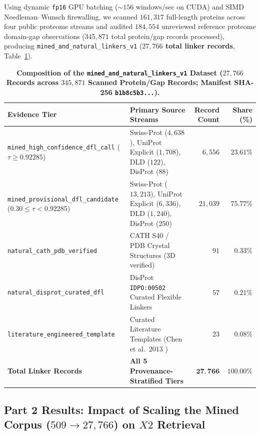 \documentclass[11pt]{article}
\begin{document}
Using dynamic \texttt{fp16} GPU batching ($\sim 156$ windows/sec on CUDA) and SIMD Needleman--Wunsch firewalling, we scanned $161{,}317$ full-length proteins across four public proteome streams and audited $184{,}554$ unreviewed reference proteome domain-gap observations ($345{,}871$ total protein/gap records processed), producing \texttt{mined\_and\_natural\_linkers\_v1} (\textbf{$27{,}766$ total linker records}, Table~\ref{tab:dataset_v1}).

\begin{table}[h]
\centering
\caption{\textbf{Composition of the \texttt{mined\_and\_natural\_linkers\_v1} Dataset ($27{,}766$ Records across $345{,}871$ Scanned Protein/Gap Records; Manifest SHA-256 \texttt{b1b8c5b3...}).}}
\label{tab:dataset_v1}
\small
\begin{tabular}{l l r r}
\toprule
\textbf{Evidence Tier} & \textbf{Primary Source Streams} & \textbf{Record Count} & \textbf{Share (\%)} \\
\midrule
\texttt{mined\_high\_confidence\_dfl\_call} ($\tau \ge 0.92285$) & Swiss-Prot ($4{,}638$), UniProt Explicit ($1{,}708$), DLD ($122$), DisProt ($88$) & $6{,}556$ & $23.61\%$ \\
\texttt{mined\_provisional\_dfl\_candidate} ($0.30 \le \tau < 0.92285$) & Swiss-Prot ($13{,}213$), UniProt Explicit ($6{,}336$), DLD ($1{,}240$), DisProt ($250$) & $21{,}039$ & $75.77\%$ \\
\texttt{natural\_cath\_pdb\_verified} & CATH S40 / PDB Crystal Structures (3D verified) & $91$ & $0.33\%$ \\
\texttt{natural\_disprot\_curated\_dfl} & DisProt \texttt{IDPO:00502} Curated Flexible Linkers & $57$ & $0.21\%$ \\
\texttt{literature\_engineered\_template} & Curated Literature Templates (Chen et al.\ 2013 \cite{chen2013fusion}) & $23$ & $0.08\%$ \\
\midrule
\textbf{Total Linker Records} & \textbf{All 5 Provenance-Stratified Tiers} & $\mathbf{27{,}766}$ & $\mathbf{100.00\%}$ \\
\bottomrule
\end{tabular}
\end{table}

\subsection{Part 2 Results: Impact of Scaling the Mined Corpus ($509 \to 27{,}766$) on $X2$ Retrieval}
\label{sec:part2}
\end{document}
